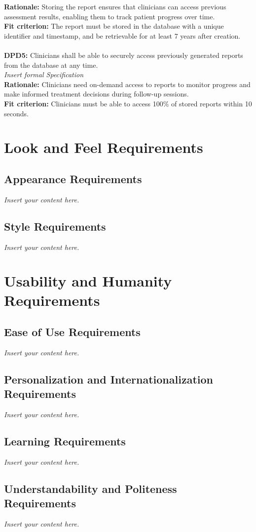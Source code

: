 \documentclass[12pt]{article}
\newcommand{\lips}{\textit{Insert your content here.}}
\begin{document}
\textbf{Rationale: }Storing the report ensures that clinicians can access previous assessment results, enabling them to track patient progress over time.\\
\textbf{Fit criterion: }The report must be stored in the database with a unique identifier and timestamp, and be retrievable for at least 7 years after creation.\\
\\
\noindent\textbf{DPD5: }Clinicians shall be able to securely access previously generated reports from the database at any time.\\
\textit{Insert formal Specification}\\
\textbf{Rationale: }Clinicians need on-demand access to reports to monitor progress and make informed treatment decisions during follow-up sessions.\\
\textbf{Fit criterion: }Clinicians must be able to access 100\% of stored reports within 10 seconds.\\

\section{Look and Feel Requirements}
\subsection{Appearance Requirements}
\lips
\subsection{Style Requirements}
\lips

\section{Usability and Humanity Requirements}
\subsection{Ease of Use Requirements}
\lips
\subsection{Personalization and Internationalization Requirements}
\lips
\subsection{Learning Requirements}
\lips
\subsection{Understandability and Politeness Requirements}
\lips
\end{document}
